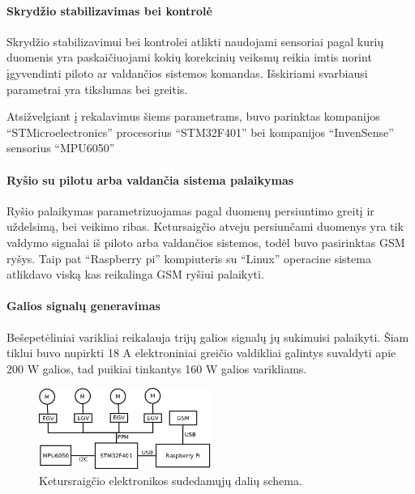 \documentclass[12pt, a4paper, lithuanian, final]{article}
\begin{document}
\paragraph{Skrydžio stabilizavimas bei kontrolė}
Skrydžio stabilizavimui bei kontrolei atlikti naudojami sensoriai pagal kurių duomenis yra paskaičiuojami kokių korekcinių veiksmų reikia imtis norint įgyvendinti piloto ar valdančios sistemos komandas.
Išskiriami svarbiausi parametrai yra tikslumas bei greitis.

Atsižvelgiant į rekalavimus šiems parametrams, buvo parinktas kompanijos "`STMicroelectronics"' procesorius "`STM32F401"' bei kompanijos "`InvenSense"' sensorius "`MPU6050"'

\paragraph{Ryšio su pilotu arba valdančia sistema palaikymas}
Ryšio palaikymas parametrizuojamas pagal duomenų persiuntimo greitį ir uždelsimą, bei veikimo ribas.
Ketursaigčio atveju persiunčami duomenys yra tik valdymo signalai iš piloto arba valdančios sistemos, todėl buvo pasirinktas GSM ryšys.
Taip pat "`Raspberry pi"' kompiuteris su "`Linux"' operacine sistema atlikdavo viską kas reikalinga GSM ryšiui palaikyti.

\paragraph{Galios signalų generavimas}
Bešepetėliniai varikliai reikalauja trijų galios signalų jų sukimuisi palaikyti.
Šiam tiklui buvo nupirkti 18 A elektroniniai greičio valdikliai galintys suvaldyti apie 200 W galios, tad puikiai tinkantys 160 W galios varikliams.

\begin{figure}[H]
\begin{center}
\includegraphics[width=0.5\textwidth]{img/elektronikosSchema.png}
\caption{Ketursraigčio elektronikos sudedamųjų dalių schema.}
\end{center}
\end{figure}
\end{document}
